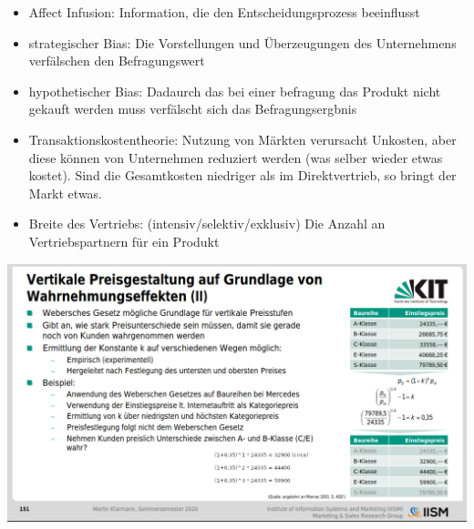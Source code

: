 \documentclass[]{article}
\begin{document}
\begin{itemize}
    \item Affect Infusion: Information, die den Entscheidungsprozess beeinflusst
    \item strategischer Bias: Die Vorstellungen und Überzeugungen des Unternehmens verfälschen den Befragungswert
    \item hypothetischer Bias: Dadaurch das bei einer befragung das Produkt nicht gekauft werden muss verfälscht sich das Befragungsergbnis
    \item Transaktionskostentheorie: Nutzung von Märkten verursacht Unkosten, aber diese können von Unternehmen reduziert werden (was selber wieder etwas kostet). Sind die Gesamtkosten niedriger als im Direktvertrieb, so bringt der Markt etwas.
    \item Breite des Vertriebs: (intensiv/selektiv/exklusiv) Die Anzahl an Vertriebspartnern für ein Produkt
\end{itemize}

\includegraphics[width=\textwidth]{bilder/vertikale-preisgestaltung.png}

\newpage

 

















\end{document}
